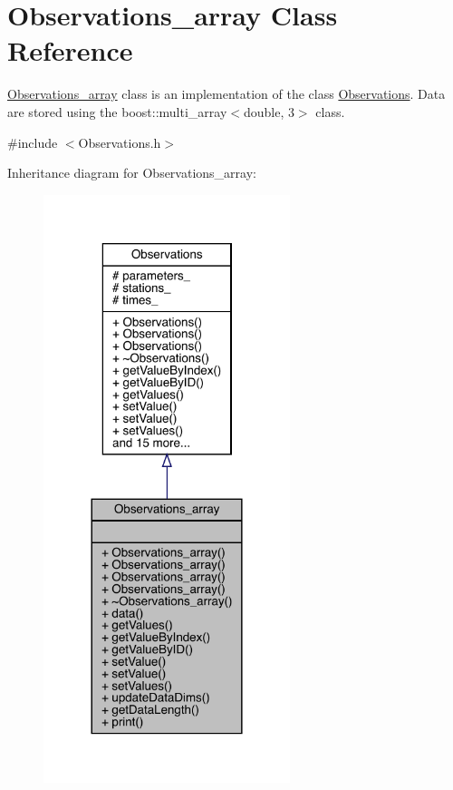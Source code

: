 \hypertarget{class_observations__array}{}\section{Observations\+\_\+array Class Reference}
\label{class_observations__array}


\mbox{\hyperlink{class_observations__array}{Observations\+\_\+array}} class is an implementation of the class \mbox{\hyperlink{class_observations}{Observations}}. Data are stored using the boost\+::multi\+\_\+array$<$double, 3$>$ class.  




{\ttfamily \#include $<$Observations.\+h$>$}



Inheritance diagram for Observations\+\_\+array\+:
\nopagebreak
\begin{figure}[H]
\begin{center}
\leavevmode
\includegraphics[width=204pt]{class_observations__array__inherit__graph}
\end{center}
\end{figure}


